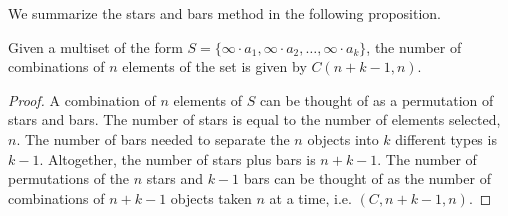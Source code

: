 \documentclass[handout]{ximera}
\begin{document}
We summarize the stars and bars method in the following proposition.

\begin{proposition}
Given a multiset of the form $S = \{\infty \cdot a_1, \infty \cdot a_2, \ldots, \infty \cdot a_k\}$, 
the number of combinations of $n$ elements of the set is given by
$C(n+k-1, n)$.
\end{proposition}
\begin{proof}
A combination of $n$ elements of $S$ can be thought of as a permutation of stars and bars. 
The number of stars is equal to the number of elements selected, $n$. 
The number of bars needed to separate the $n$ objects into $k$ different types is $k-1$. 
Altogether, the number of stars plus bars is $n + k-1$. 
The number of permutations of the $n$ stars and $k-1$ bars can be thought of as 
the number of combinations of $n+k-1$ objects taken $n$ at a time, i.e. $(C, n+k-1,n)$. 
\end{proof}
\end{document}
